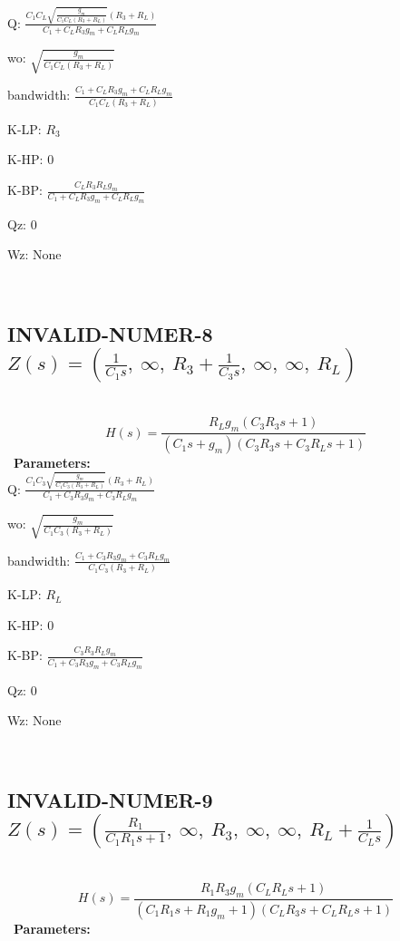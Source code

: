 \documentclass{article}
\begin{document}
Q: $\frac{C_{1} C_{L} \sqrt{\frac{g_{m}}{C_{1} C_{L} \left(R_{3} + R_{L}\right)}} \left(R_{3} + R_{L}\right)}{C_{1} + C_{L} R_{3} g_{m} + C_{L} R_{L} g_{m}}$\ 

wo: $\sqrt{\frac{g_{m}}{C_{1} C_{L} \left(R_{3} + R_{L}\right)}}$\ 

bandwidth: $\frac{C_{1} + C_{L} R_{3} g_{m} + C_{L} R_{L} g_{m}}{C_{1} C_{L} \left(R_{3} + R_{L}\right)}$\ 

K-LP: $R_{3}$\ 

K-HP: $0$\ 

K-BP: $\frac{C_{L} R_{3} R_{L} g_{m}}{C_{1} + C_{L} R_{3} g_{m} + C_{L} R_{L} g_{m}}$\ 

Qz: $0$\ 

Wz: $\text{None}$\ 

\ 

\subsection{INVALID-NUMER-8 $Z(s) = \left( \frac{1}{C_{1} s}, \  \infty, \  R_{3} + \frac{1}{C_{3} s}, \  \infty, \  \infty, \  R_{L}\right)$ } \ 
\textbf{\[H(s) = \frac{R_{L} g_{m} \left(C_{3} R_{3} s + 1\right)}{\left(C_{1} s + g_{m}\right) \left(C_{3} R_{3} s + C_{3} R_{L} s + 1\right)}\] } \ 
\textbf{Parameters:}\\ 

Q: $\frac{C_{1} C_{3} \sqrt{\frac{g_{m}}{C_{1} C_{3} \left(R_{3} + R_{L}\right)}} \left(R_{3} + R_{L}\right)}{C_{1} + C_{3} R_{3} g_{m} + C_{3} R_{L} g_{m}}$\ 

wo: $\sqrt{\frac{g_{m}}{C_{1} C_{3} \left(R_{3} + R_{L}\right)}}$\ 

bandwidth: $\frac{C_{1} + C_{3} R_{3} g_{m} + C_{3} R_{L} g_{m}}{C_{1} C_{3} \left(R_{3} + R_{L}\right)}$\ 

K-LP: $R_{L}$\ 

K-HP: $0$\ 

K-BP: $\frac{C_{3} R_{3} R_{L} g_{m}}{C_{1} + C_{3} R_{3} g_{m} + C_{3} R_{L} g_{m}}$\ 

Qz: $0$\ 

Wz: $\text{None}$\ 

\ 

\subsection{INVALID-NUMER-9 $Z(s) = \left( \frac{R_{1}}{C_{1} R_{1} s + 1}, \  \infty, \  R_{3}, \  \infty, \  \infty, \  R_{L} + \frac{1}{C_{L} s}\right)$ } \ 
\textbf{\[H(s) = \frac{R_{1} R_{3} g_{m} \left(C_{L} R_{L} s + 1\right)}{\left(C_{1} R_{1} s + R_{1} g_{m} + 1\right) \left(C_{L} R_{3} s + C_{L} R_{L} s + 1\right)}\] } \ 
\textbf{Parameters:}\\ 
\end{document}
